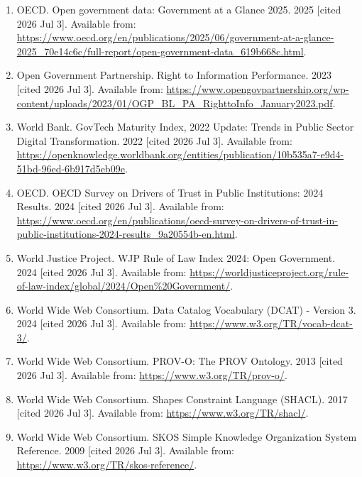 \documentclass[
]{article}
\begin{document}
\begin{enumerate}
  2023 {[}cited 2026 Jul 3{]}. Available from:
  \url{https://www.oecd.org/content/dam/oecd/en/publications/reports/2023/11/open-government-for-stronger-democracies_88aa0131/5478db5b-en.pdf}.
\hypertarget{ref-10}{}
\item
  OECD. Open government data: Government at a Glance 2025. 2025 {[}cited
  2026 Jul 3{]}. Available from:
  \url{https://www.oecd.org/en/publications/2025/06/government-at-a-glance-2025_70e14c6c/full-report/open-government-data_619b668c.html}.
\hypertarget{ref-11}{}
\item
  Open Government Partnership. Right to Information Performance. 2023
  {[}cited 2026 Jul 3{]}. Available from:
  \url{https://www.opengovpartnership.org/wp-content/uploads/2023/01/OGP_BL_PA_RighttoInfo_January2023.pdf}.
\hypertarget{ref-12}{}
\item
  World Bank. GovTech Maturity Index, 2022 Update: Trends in Public
  Sector Digital Transformation. 2022 {[}cited 2026 Jul 3{]}. Available
  from:
  \url{https://openknowledge.worldbank.org/entities/publication/10b535a7-e9d4-51bd-96ed-6b917d5eb09e}.
\hypertarget{ref-13}{}
\item
  OECD. OECD Survey on Drivers of Trust in Public Institutions: 2024
  Results. 2024 {[}cited 2026 Jul 3{]}. Available from:
  \url{https://www.oecd.org/en/publications/oecd-survey-on-drivers-of-trust-in-public-institutions-2024-results_9a20554b-en.html}.
\hypertarget{ref-14}{}
\item
  World Justice Project. WJP Rule of Law Index 2024: Open Government.
  2024 {[}cited 2026 Jul 3{]}. Available from:
  \url{https://worldjusticeproject.org/rule-of-law-index/global/2024/Open\%20Government/}.
\hypertarget{ref-15}{}
\item
  World Wide Web Consortium. Data Catalog Vocabulary (DCAT) - Version 3.
  2024 {[}cited 2026 Jul 3{]}. Available from:
  \url{https://www.w3.org/TR/vocab-dcat-3/}.
\hypertarget{ref-16}{}
\item
  World Wide Web Consortium. PROV-O: The PROV Ontology. 2013 {[}cited
  2026 Jul 3{]}. Available from: \url{https://www.w3.org/TR/prov-o/}.
\hypertarget{ref-17}{}
\item
  World Wide Web Consortium. Shapes Constraint Language (SHACL). 2017
  {[}cited 2026 Jul 3{]}. Available from:
  \url{https://www.w3.org/TR/shacl/}.
\hypertarget{ref-18}{}
\item
  World Wide Web Consortium. SKOS Simple Knowledge Organization System
  Reference. 2009 {[}cited 2026 Jul 3{]}. Available from:
  \url{https://www.w3.org/TR/skos-reference/}.

\end{enumerate}
\end{document}

